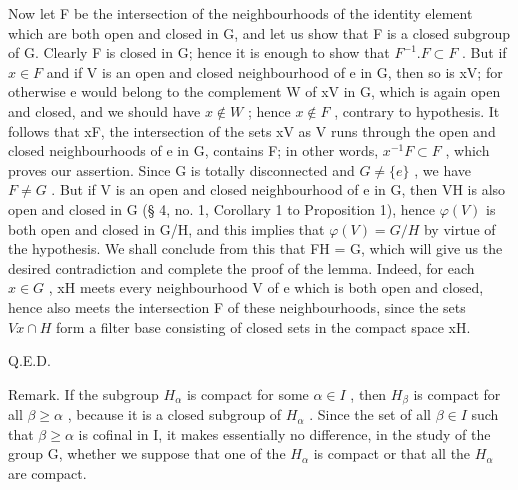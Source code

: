 Now let F be the intersection of the neighbourhoods of the identity element which are both open and closed in G, and let us show that F is a closed subgroup of G. Clearly F is closed in G; hence it is enough to show that \(F^{-1}.F \subset F\) . But if \(x \in F\) and if V is an open and closed neighbourhood of e in G, then so is xV; for otherwise e would belong to the complement W of xV in G, which is again open and closed, and we should have \(x \notin W\) ; hence \(x \notin F\) , contrary to hypothesis. It follows that xF, the intersection of the sets xV as V runs through the open and closed neighbourhoods of e in G, contains F; in other words, \(x^{-1}F \subset F\) , which proves our assertion. Since G is totally disconnected and \(G \neq \{e\}\) , we have \(F \neq G\) . But if V is an open and closed neighbourhood of e in G, then VH is also open and closed in G (§ 4, no. 1, Corollary 1 to Proposition 1), hence \(\varphi(V)\) is both open and closed in G/H, and this implies that \(\varphi(V) = G/H\) by virtue of the hypothesis. We shall conclude from this that FH = G, which will give us the desired contradiction and complete the proof of the lemma. Indeed, for each \(x \in G\) , xH meets every neighbourhood V of e which is both open and closed, hence also meets the intersection F of these neighbourhoods, since the sets \(Vx \cap H\) form a filter base consisting of closed sets in the compact space xH.

Q.E.D.

Remark. If the subgroup \(H_{\alpha}\) is compact for some \(\alpha \in I\) , then \(H_{\beta}\) is compact for all \(\beta \geqslant \alpha\) , because it is a closed subgroup of \(H_{\alpha}\) . Since the set of all \(\beta \in I\) such that \(\beta \geqslant \alpha\) is cofinal in I, it makes essentially no difference, in the study of the group G, whether we suppose that one of the \(H_{\alpha}\) is compact or that all the \(H_{\alpha}\) are compact.

